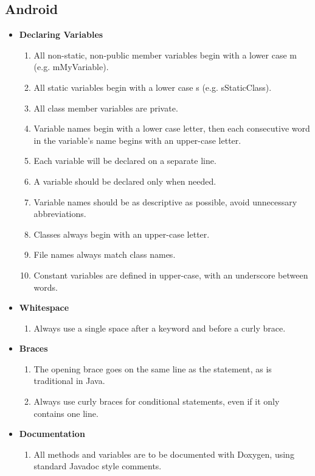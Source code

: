 \documentclass[11pt,a4paper]{article}
\begin{document}
\subsection{Android}
\begin{itemize}
\item \textbf{Declaring Variables}
	\begin{enumerate}
	\item All non-static, non-public member variables begin with a lower case m (e.g. mMyVariable).
	\item All static variables begin with a lower case s (e.g. sStaticClass).
	\item All class member variables are private.
	\item Variable names begin with a lower case letter, then each consecutive word in the variable's name begins with an upper-case letter.
	\item Each variable will be declared on a separate line.
	\item A variable should be declared only when needed.
	\item Variable names should be as descriptive as possible, avoid unnecessary abbreviations.
	\item Classes always begin with an upper-case letter.
	\item File names always match class names.
	\item Constant variables are defined in upper-case, with an underscore between words.
	\end{enumerate}
\item \textbf{Whitespace}
	\begin{enumerate}
	\item Always use a single space after a keyword and before a curly brace.
	\end{enumerate}
\item \textbf{Braces}
	\begin{enumerate}
	\item The opening brace goes on the same line as the statement, as is traditional in Java.
	\item Always use curly braces for conditional statements, even if it only contains one line.
	\end{enumerate}
\item \textbf{Documentation}
	\begin{enumerate}
	\item All methods and variables are to be documented with Doxygen, using standard Javadoc style comments.
	\end{enumerate}
\end{itemize}
\end{document}
